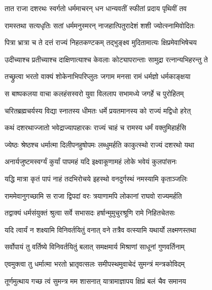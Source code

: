 \twolineshloka
{तात राजा दशरथः स्वर्गतो धर्ममाचरन्}
{धन धान्यवतीं स्फीतां प्रदाय पृथिवीं तव} %

\twolineshloka
{रामस्तथा सत्यधृतिः सतां धर्ममनुस्मरन्}
{नाजहात्पितुरादेशं शशी ज्योत्स्नामिवोदितः} %

\twolineshloka
{पित्रा भ्रात्रा च ते दत्तं राज्यं निहतकण्टकम्}
{तद्भुङ्क्ष्व मुदितामात्यः क्षिप्रमेवाभिषेचय} %

\twolineshloka
{उदीच्याश्च प्रतीच्याश्च दाक्षिणात्याश्च केवलाः}
{कोट्यापरान्ताः सामुद्रा रत्नान्यभिहरन्तु ते} %

\twolineshloka
{तच्छ्रुत्वा भरतो वाक्यं शोकेनाभिपरिप्लुतः}
{जगाम मनसा रामं धर्मज्ञो धर्मकाङ्क्षया} %

\twolineshloka
{स बाष्पकलया वाचा कलहंसस्वरो युवा}
{विललाप सभामध्ये जगर्हे च पुरोहितम्} %

\twolineshloka
{चरितब्रह्मचर्यस्य विद्या स्नातस्य धीमतः}
{धर्मे प्रयतमानस्य को राज्यं मद्विधो हरेत्} %

\twolineshloka
{कथं दशरथाज्जातो भवेद्राज्यापहारकः}
{राज्यं चाहं च रामस्य धर्मं वक्तुमिहार्हसि} %

\twolineshloka
{ज्येष्ठः श्रेष्ठश्च धर्मात्मा दिलीपनहुषोपमः}
{लब्धुमर्हति काकुत्स्थो राज्यं दशरथो यथा} %

\twolineshloka
{अनार्यजुष्टमस्वर्ग्यं कुर्यां पापमहं यदि}
{इक्ष्वाकूणामहं लोके भवेयं कुलपांसनः} %

\twolineshloka
{यद्धि मात्रा कृतं पापं नाहं तदभिरोचये}
{इहस्थो वनदुर्गस्थं नमस्यामि कृताञ्जलिः} %

\twolineshloka
{राममेवानुगच्छामि स राजा द्विपदां वरः}
{त्रयाणामपि लोकानां राघवो राज्यमर्हति} %

\twolineshloka
{तद्वाक्यं धर्मसंयुक्तं श्रुत्वा सर्वे सभासदः}
{हर्षान्मुमुचुरश्रूणि रामे निहितचेतसः} %

\twolineshloka
{यदि त्वार्यं न शक्ष्यामि विनिवर्तयितुं वनात्}
{वने तत्रैव वत्स्यामि यथार्यो लक्ष्मणस्तथा} %

\twolineshloka
{सर्वोपायं तु वर्तिष्ये विनिवर्तयितुं बलात्}
{समक्षमार्य मिश्राणां साधूनां गुणवर्तिनाम्} %

\twolineshloka
{एवमुक्त्वा तु धर्मात्मा भरतो भ्रातृवत्सलः}
{समीपस्थमुवाचेदं सुमन्त्रं मन्त्रकोविदम्} %

\twolineshloka
{तूर्णमुत्थाय गच्छ त्वं सुमन्त्र मम शासनात्}
{यात्रामाज्ञापय क्षिप्रं बलं चैव समानय} %


